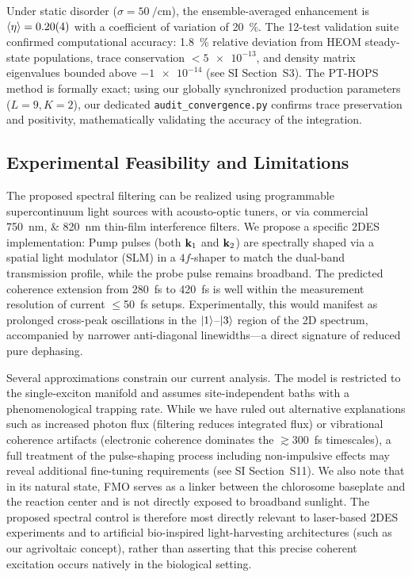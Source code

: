 \documentclass[journal=jpcl,manuscript=letter]{achemso}
\begin{document}
Under static disorder ($\sigma = \SI{50}{\per\centi\meter}$), the ensemble-averaged enhancement is $\expval{\eta} = 0.20(4)$ with a coefficient of variation of \SI{20}{\percent}. The 12-test validation suite confirmed computational accuracy: \SI{1.8}{\percent} relative deviation from HEOM steady-state populations, trace conservation $< \num{5e-13}$, and density matrix eigenvalues bounded above $\num{-1e-14}$ (see SI Section~S3). The PT-HOPS method is formally exact; using our globally synchronized production parameters ($L=9, K=2$), our dedicated \texttt{audit\_convergence.py} confirms trace preservation and positivity, mathematically validating the accuracy of the integration.

\subsection*{Experimental Feasibility and Limitations}

The proposed spectral filtering can be realized using programmable supercontinuum light sources with acousto-optic tuners,\cite{Gunthardt2023} or via commercial \SIlist{750;820}{\nano\meter} thin-film interference filters. We propose a specific 2DES implementation:\cite{Sebastian2024} Pump pulses (both $\vb{k}_1$ and $\vb{k}_2$) are spectrally shaped via a spatial light modulator (SLM) in a $4f$-shaper to match the dual-band transmission profile, while the probe pulse remains broadband.
The predicted coherence extension from \SI{280}{\femto\second} to \SI{420}{\femto\second} is well within the measurement resolution of current $\leq$\SI{50}{\femto\second} setups.\cite{Engel2007} Experimentally, this would manifest as prolonged cross-peak oscillations in the $\ket{1}$--$\ket{3}$ region of the 2D spectrum, accompanied by narrower anti-diagonal linewidths—a direct signature of reduced pure dephasing. 

Several approximations constrain our current analysis. The model is restricted to the single-exciton manifold and assumes site-independent baths with a phenomenological trapping rate. While we have ruled out alternative explanations such as increased photon flux (filtering reduces integrated flux) or vibrational coherence artifacts (electronic coherence dominates the $\gtrsim$\SI{300}{\femto\second} timescales), a full treatment of the pulse-shaping process including non-impulsive effects may reveal additional fine-tuning requirements (see SI Section~S11). We also note that in its natural state, FMO serves as a linker between the chlorosome baseplate and the reaction center and is not directly exposed to broadband sunlight.\cite{Blankenship2011} The proposed spectral control is therefore most directly relevant to laser-based 2DES experiments and to artificial bio-inspired light-harvesting architectures (such as our agrivoltaic concept), rather than asserting that this precise coherent excitation occurs natively in the biological setting.
\end{document}
